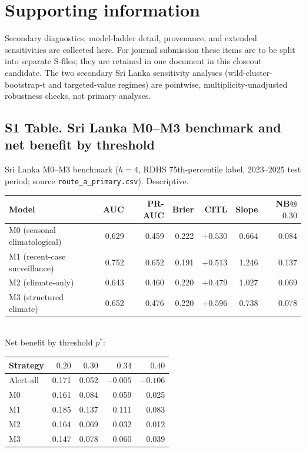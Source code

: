 \documentclass[11pt,a4paper]{article}
\begin{document}
\section*{Supporting information}
\begingroup{}\sloppy
\noindent Secondary diagnostics, model-ladder detail, provenance, and extended sensitivities are collected here. For journal submission these items are to be split into separate S-files; they are retained in one document in this closeout candidate. The two secondary Sri Lanka sensitivity analyses (wild-cluster-bootstrap-t and targeted-value regimes) are pointwise, multiplicity-unadjusted robustness checks, not primary analyses.

\subsection*{S1 Table. Sri Lanka M0--M3 benchmark and net benefit by threshold}
\noindent Sri Lanka M0--M3 benchmark ($h=4$, RDHS 75th-percentile label, 2023--2025 test period; source \texttt{route\_a\_primary.csv}). Descriptive.\\[0.3em]
{\footnotesize\begin{tabular}{@{}lrrrrrr@{}}
\toprule
Model & AUC & PR-AUC & Brier & CITL & Slope & NB@$0.30$ \\
\midrule
M0 (seasonal climatological) & 0.629 & 0.459 & 0.222 & $+0.530$ & 0.664 & 0.084 \\
M1 (recent-case surveillance) & 0.752 & 0.652 & 0.191 & $+0.513$ & 1.246 & 0.137 \\
M2 (climate-only) & 0.643 & 0.460 & 0.220 & $+0.479$ & 1.027 & 0.069 \\
M3 (structured climate) & 0.652 & 0.476 & 0.220 & $+0.596$ & 0.738 & 0.078 \\
\bottomrule
\end{tabular}\\[0.4em]
Net benefit by threshold $p^*$:\\
\begin{tabular}{@{}lrrrr@{}}
\toprule
Strategy & $0.20$ & $0.30$ & $0.34$ & $0.40$ \\
\midrule
Alert-all & 0.171 & 0.052 & $-0.005$ & $-0.106$ \\
M0 & 0.161 & 0.084 & 0.059 & 0.025 \\
M1 & 0.185 & 0.137 & 0.111 & 0.083 \\
M2 & 0.164 & 0.069 & 0.032 & 0.012 \\
M3 & 0.147 & 0.078 & 0.060 & 0.039 \\
\bottomrule
\end{tabular}}
\end{document}
